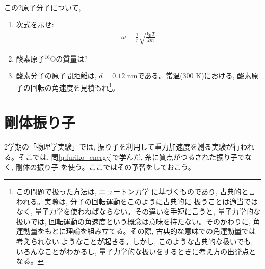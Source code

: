 %
\begin{q}\label{q:mominert_molecule}
この2原子分子について, 
\begin{enumerate}
\item 次式を示せ:
\begin{eqnarray}
\omega=\frac{1}{r}\sqrt{\frac{k_{\text{B}}T}{2m}}\label{eq:2atommolrot3}
\end{eqnarray}
\item 酸素原子$^{16}$Oの質量は?
\item 酸素分子の原子間距離は, $d=0.12\text{ nm}$である。常温(300 K)における, 
酸素原子の回転の角速度を見積もれ\footnote{この問題で扱った方法は, ニュートン力学
に基づくものであり, 古典的と言われる。実際は, 分子の回転運動をこのように古典的に
扱うことは適当ではなく, 量子力学を使わねばならない。その違いを手短に言うと, 
量子力学的な扱いでは, 回転運動の角速度という概念は意味を持たない。そのかわりに, 
角運動量をもとに理論を組み立てる。その際, 古典的な意味での角運動量では考えられない
ようなことが起きる。しかし, このような古典的な扱いでも, いろんなことがわかるし, 
量子力学的な扱いをするときに考え方の出発点となる。}。
\end{enumerate}
\hv

\section{剛体振り子}

2学期の「物理学実験」では, 振り子を利用して重力加速度を測る実験が行われる。そこでは, 
問\ref{q:furiko_energy}で学んだ, 糸に質点がつるされた振り子でなく, 剛体の振り子
を使う。ここではその予習をしておこう。\mv


\end{q}
